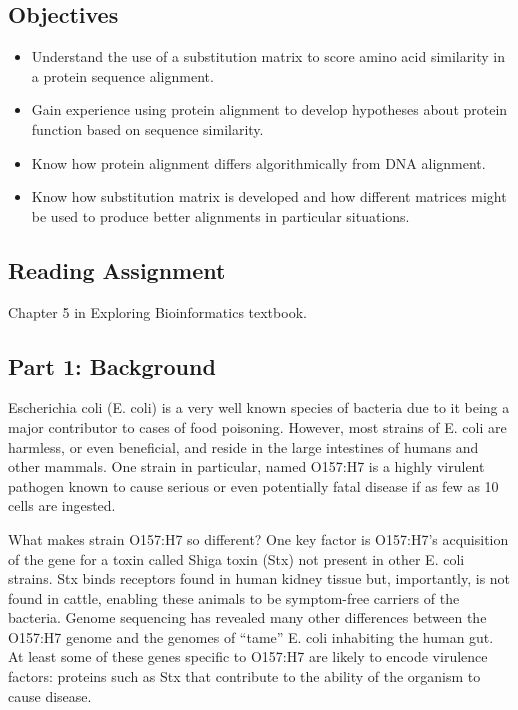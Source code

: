 \vspace*{-.1in}
\subsection*{Objectives}
\vspace*{-.1in}

\begin{itemize}
	\item Understand the use of a substitution matrix to score amino acid similarity in a protein sequence alignment.
	\item Gain experience using protein alignment to develop hypotheses about protein function based on sequence similarity.  
	\item Know how protein alignment differs algorithmically from DNA alignment.
	\item Know how substitution matrix is developed and how different matrices might be used to produce better alignments in particular situations.

\end{itemize}

\vspace*{-.1in}
\subsection*{Reading Assignment}
\vspace*{-.1in}
Chapter 5 in Exploring Bioinformatics textbook.



\vspace*{-.1in}
\subsection*{Part 1: Background}
\vspace*{-.1in} 

Escherichia coli (E. coli) is a very well known species of bacteria due to it being a major contributor to cases of food poisoning.  However, most strains of E. coli are harmless, or even beneficial, and reside in the large intestines of humans and other mammals.  One strain in particular, named O157:H7 is a highly virulent pathogen known to cause serious or even potentially fatal disease if as few as 10 cells are ingested.  

What makes strain O157:H7 so different? One key factor is O157:H7's acquisition of the gene for a toxin called Shiga toxin (Stx) not present in other E. coli strains.  Stx binds receptors found in human kidney tissue but, importantly, is not found in cattle, enabling these animals to be symptom-free carriers of the bacteria.  Genome sequencing has revealed many other differences between the O157:H7 genome and the genomes of ``tame'' E. coli inhabiting the human gut.  At least some of these genes specific to O157:H7 are likely to encode virulence factors: proteins such as Stx that contribute to the ability of the organism to cause disease.

